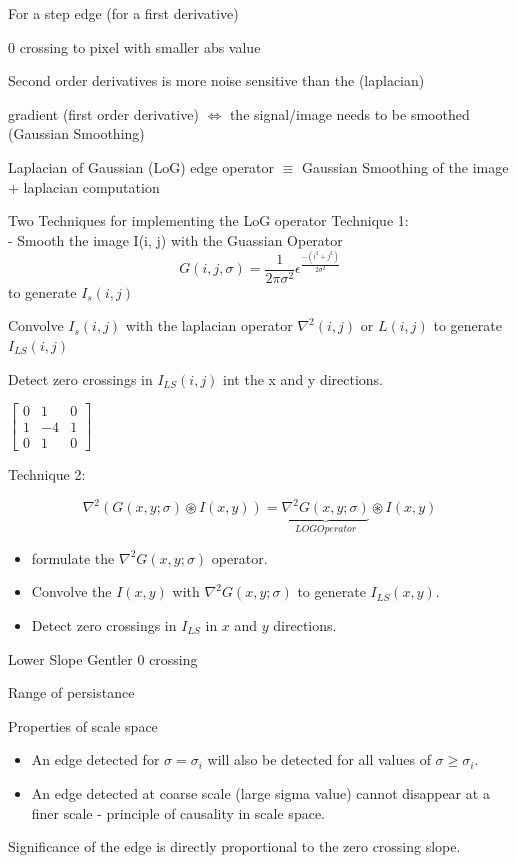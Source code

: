 \documentclass[11pt]{article}
\theoremstyle{definition}
\begin{document}
For a step edge (for a first derivative)

0 crossing to pixel with smaller abs value 
\newpage
\pagestyle{fancy}  %

\newpage
Second order derivatives is more noise sensitive than the (laplacian)

gradient (first order derivative) $\iff$ the signal/image needs to be smoothed (Gaussian Smoothing)

Laplacian of Gaussian (LoG) edge operator $\equiv$ Gaussian Smoothing of the image + laplacian computation

Two Techniques for implementing the LoG operator
Technique 1:\\
- Smooth the image I(i, j) with the Guassian Operator 
\[
    G(i, j, \sigma) = \frac{1}{2\pi\sigma^2} \epsilon^\frac{-(i^2+j^2)}{2\sigma^2} 
\]
to generate $I_s(i, j)$

Convolve $I_s(i,j)$ with the laplacian operator $\nabla^2(i, j) \text{ or } L(i, j)$ to generate $I_{LS}(i, j)$

 
Detect zero crossings in $I_{LS} (i, j)$ int the x and y directions.

$\begin{bmatrix}
0 & 1 & 0 \\
1 & -4 & 1 \\
0 & 1 & 0
\end{bmatrix}$

Technique 2:

\[
\nabla^2(G(x,y;\sigma)\circledast I(x,y)) = \underbrace{\nabla^2G(x,y;\sigma)}_{LOG Operator} \circledast I(x, y)
\]

\begin{itemize}
    \item formulate the $\nabla^2G(x,y;\sigma)$ operator.
    \item Convolve the $I(x,y)$ with $\nabla^2G(x,y;\sigma)$ to generate $I_{LS}(x,y).$
    \item Detect zero crossings in $I_{LS}$ in $x$ and $y$ directions.
\end{itemize}
\newpage
\pagestyle{fancy}  %

Lower Slope Gentler 0 crossing


Range of persistance

Properties of scale space
\begin{itemize}
    \item  An edge detected for $\sigma = \sigma_i$ will also be detected for all values of $\sigma\ge\sigma_i$.
    \item  An edge detected at coarse scale (large sigma value) cannot disappear at a finer scale - principle of causality in scale space.
\end{itemize}
Significance of the edge is directly proportional to the zero crossing slope.
\end{document}
